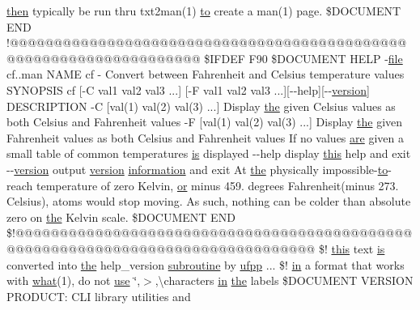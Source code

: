 \begin{DoxyCompactItemize}
\hyperlink{intro__blas1_83_8txt_aeaad1761c101f906d503f68274bd4b83}{then} typically be run thru txt2man(1) \hyperlink{M__stopwatch_83_8txt_a97209fd3e34ef701c0a9734280779cbb}{to} create a man(1) page. \$D\+O\+C\+U\+M\+E\+NT E\+ND !@@@@@@@@@@@@@@@@@@@@@@@@@@@@@@@@@@@@@@@@@@@@@@@@@@@@@@@@@@@@@@@@@@@ \$I\+F\+D\+EF F90 \$D\+O\+C\+U\+M\+E\+NT H\+E\+LP -\/\hyperlink{what__overview_81_8txt_a447b56c526e8da30e0dc94673727ee25}{file} cf..\+man N\+A\+ME cf -\/ Convert between Fahrenheit and Celsius temperature values S\+Y\+N\+O\+P\+S\+IS cf \mbox{[}-\/C val1 val2 val3 ...\mbox{]} \mbox{[}-\/F val1 val2 val3 ...\mbox{]}\mbox{[}-\/-\/help\mbox{]}\mbox{[}-\/-\/\hyperlink{inquiry__stopwatch_83_8txt_aee378be19d20935dd436517beda00ee4}{version}\mbox{]} D\+E\+S\+C\+R\+I\+P\+T\+I\+ON -\/C \mbox{[}val(1) val(2) val(3) ...\mbox{]} Display \hyperlink{M__stopwatch_83_8txt_a0f266597de2e57eb3aa964927bb30e14}{the} given Celsius values as both Celsius and Fahrenheit values -\/F \mbox{[}val(1) val(2) val(3) ...\mbox{]} Display \hyperlink{M__stopwatch_83_8txt_a0f266597de2e57eb3aa964927bb30e14}{the} given Fahrenheit values as both Celsius and Fahrenheit values If no values \hyperlink{M__stopwatch_83_8txt_a5040be02b832eba08820289c8a1f81c4}{are} given a small table of common temperatures \hyperlink{intro__blas1_83_8txt_a42a91df93f840595de3019ceb5d1df23}{is} displayed -\/-\/help display \hyperlink{M__stopwatch_83_8txt_ad62a52042bb610eee5b36b5516caec22}{this} help and exit -\/-\/\hyperlink{inquiry__stopwatch_83_8txt_aee378be19d20935dd436517beda00ee4}{version} output \hyperlink{inquiry__stopwatch_83_8txt_aee378be19d20935dd436517beda00ee4}{version} \hyperlink{M__stopwatch_83_8txt_a9f7f0ce21871efda7da3eda76d1d3cff}{information} and exit At \hyperlink{M__stopwatch_83_8txt_a0f266597de2e57eb3aa964927bb30e14}{the} physically impossible-\/\hyperlink{M__stopwatch_83_8txt_a97209fd3e34ef701c0a9734280779cbb}{to}-\/reach temperature of zero Kelvin, \hyperlink{what__overview_81_8txt_a08ee81dca94cf4ba88d4a64051e232d5}{or} minus 459. degrees Fahrenheit(minus 273. Celsius), atoms would stop moving. As such, nothing can be colder than absolute zero on \hyperlink{M__stopwatch_83_8txt_a0f266597de2e57eb3aa964927bb30e14}{the} Kelvin scale. \$D\+O\+C\+U\+M\+E\+NT E\+ND \$!@@@@@@@@@@@@@@@@@@@@@@@@@@@@@@@@@@@@@@@@@@@@@@@@@@@@@@@@@@@@@@@@@@@@@@@@@@@@@@@@ \$! \hyperlink{M__stopwatch_83_8txt_ad62a52042bb610eee5b36b5516caec22}{this} text \hyperlink{intro__blas1_83_8txt_a42a91df93f840595de3019ceb5d1df23}{is} converted into \hyperlink{M__stopwatch_83_8txt_a0f266597de2e57eb3aa964927bb30e14}{the} help\+\_\+version \hyperlink{M__stopwatch_83_8txt_acfbcff50169d691ff02d4a123ed70482}{subroutine} by \hyperlink{ufpp__overview_81_8txt_a97c20a96bcab81bc74c9d64b001f1202}{ufpp} ... \$! \hyperlink{M__journal_83_8txt_afce72651d1eed785a2132bee863b2f38}{in} a format that works with \hyperlink{what__overview_81_8txt_adadc702e2a3423fa136bfa5b1e01b511}{what}(1), do not \hyperlink{intro__blas1_83_8txt_a04fa2694d85f67a675bb3f45f7241f48}{use} \char`\"{},$>$,\textbackslash{}characters \hyperlink{M__journal_83_8txt_afce72651d1eed785a2132bee863b2f38}{in} \hyperlink{M__stopwatch_83_8txt_a0f266597de2e57eb3aa964927bb30e14}{the} labels \$D\+O\+C\+U\+M\+E\+NT V\+E\+R\+S\+I\+ON P\+R\+O\+D\+U\+C\+T\+: C\+LI library utilities and 
\end{DoxyCompactItemize}
